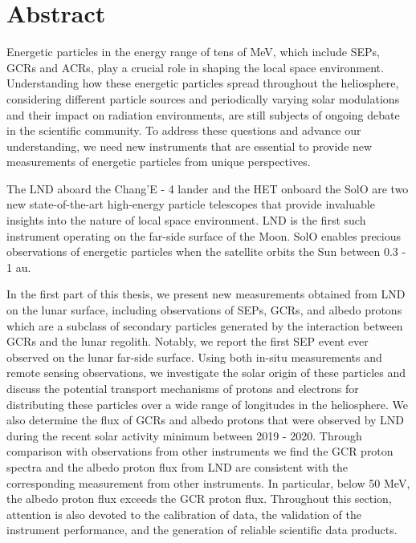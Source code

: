 \chapter*{Abstract}
Energetic particles in the energy range of tens of MeV, which include \acp{SEP}, \acp{GCR} and \acp{ACR},  play a crucial role in shaping the local space environment. Understanding how these energetic particles spread throughout the heliosphere, considering different particle sources and periodically varying solar modulations and their impact on radiation environments, are still subjects of ongoing debate in the scientific community. To address these questions and advance our understanding, we need new instruments that are essential to provide new measurements of energetic particles from unique perspectives.

The \ac{LND} aboard the Chang'E - 4 lander and the \ac{HET} onboard the \ac{SolO} are two new state-of-the-art high-energy particle telescopes that provide invaluable insights into the nature of local space environment. \ac{LND} is the first such instrument operating on the far-side surface of the Moon. \ac{SolO} enables precious observations of energetic particles when the satellite orbits the Sun between 0.3 - 1 au.

In the first part of this thesis, we present new measurements obtained from \ac{LND} on the lunar surface, including observations of \acp{SEP}, \acp{GCR}, and albedo protons which are a subclass of secondary particles generated by the interaction between \acp{GCR} and the lunar regolith. Notably, we report the first \ac{SEP} event ever observed on the lunar far-side surface. Using both in-situ measurements and remote sensing observations, we investigate the solar origin of these particles and discuss the potential transport mechanisms of protons and electrons for distributing these particles over a wide range of longitudes in the heliosphere. We also determine the flux of \acp{GCR} and albedo protons that were observed by \ac{LND} during the recent solar activity minimum between 2019 - 2020. Through comparison with observations from other instruments
we find the \ac{GCR} proton spectra and the albedo proton flux from \ac{LND} are consistent with the corresponding measurement from other instruments. In particular, below 50 MeV, the albedo proton ﬂux exceeds the \ac{GCR} proton ﬂux.
Throughout this section, attention is also devoted to the calibration of data, the validation of the instrument performance, and the generation of reliable scientific data products.

